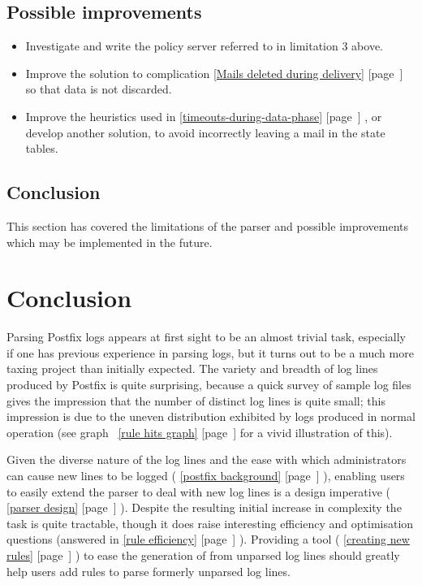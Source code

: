 \documentclass[a4paper,12pt,draft]{article}
\newcommand{\refwithpage}[1]{%
    \empty{}\ref{#1} [page~\pageref{#1}]%
}
\newcommand{\sectionref}[1]{%
    \textsection{}\refwithpage{#1}%
}
\begin{document}
\subsection{Possible improvements}

\begin{itemize}

    \item Investigate and write the policy server referred to in limitation
        3 above.

    \item Improve the solution to complication \sectionref{Mails deleted
        during delivery} so that data is not discarded.

    \item Improve the heuristics used in
        \sectionref{timeouts-during-data-phase}, or develop another
        solution, to avoid incorrectly leaving a mail in the state tables.

\end{itemize}

\subsection{Conclusion}

This section has covered the limitations of the parser and possible
improvements which may be implemented in the future.


\section{Conclusion}

\label{conclusion}

Parsing Postfix logs appears at first sight to be an almost trivial task,
especially if one has previous experience in parsing logs, but it turns out
to be a much more taxing project than initially expected.  The variety and
breadth of log lines produced by Postfix is quite surprising, because a
quick survey of sample log files gives the impression that the number of
distinct log lines is quite small; this impression is due to the uneven
distribution exhibited by logs produced in normal operation (see
graph~\refwithpage{rule hits graph} for a vivid illustration of this).  


Given the diverse nature of the log lines and the ease with which
administrators can cause new lines to be logged (\sectionref{postfix
background}), enabling users to easily extend the parser to deal with new
log lines is a design imperative (\sectionref{parser design}).  Despite the
resulting initial increase in complexity the task is quite tractable,
though it does raise interesting efficiency and optimisation questions
(answered in \sectionref{rule efficiency}).  Providing a tool
(\sectionref{creating new rules}) to ease the generation of \regexes{} from
unparsed log lines should greatly help users add rules to parse formerly
unparsed log lines.
\end{document}
